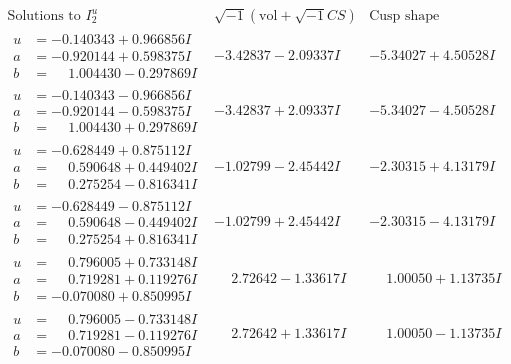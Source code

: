 \documentclass[1p]{elsarticle_modified}
\theoremstyle{definition}
\newcommand{\I}{\sqrt{-1}}
\begin{document}
$$\begin{array}{c|c|c}  
\text{Solutions to }I^u_{2}& \I (\text{vol} + \sqrt{-1}CS) & \text{Cusp shape}\\
 \hline 
\begin{aligned}
u &= -0.140343 + 0.966856 I \\
a &= -0.920144 + 0.598375 I \\
b &= \phantom{-}1.004430 - 0.297869 I\end{aligned}
 & -3.42837 - 2.09337 I & -5.34027 + 4.50528 I \\ \hline\begin{aligned}
u &= -0.140343 - 0.966856 I \\
a &= -0.920144 - 0.598375 I \\
b &= \phantom{-}1.004430 + 0.297869 I\end{aligned}
 & -3.42837 + 2.09337 I & -5.34027 - 4.50528 I \\ \hline\begin{aligned}
u &= -0.628449 + 0.875112 I \\
a &= \phantom{-}0.590648 + 0.449402 I \\
b &= \phantom{-}0.275254 - 0.816341 I\end{aligned}
 & -1.02799 - 2.45442 I & -2.30315 + 4.13179 I \\ \hline\begin{aligned}
u &= -0.628449 - 0.875112 I \\
a &= \phantom{-}0.590648 - 0.449402 I \\
b &= \phantom{-}0.275254 + 0.816341 I\end{aligned}
 & -1.02799 + 2.45442 I & -2.30315 - 4.13179 I \\ \hline\begin{aligned}
u &= \phantom{-}0.796005 + 0.733148 I \\
a &= \phantom{-}0.719281 + 0.119276 I \\
b &= -0.070080 + 0.850995 I\end{aligned}
 & \phantom{-}2.72642 - 1.33617 I & \phantom{-}1.00050 + 1.13735 I \\ \hline\begin{aligned}
u &= \phantom{-}0.796005 - 0.733148 I \\
a &= \phantom{-}0.719281 - 0.119276 I \\
b &= -0.070080 - 0.850995 I\end{aligned}
 & \phantom{-}2.72642 + 1.33617 I & \phantom{-}1.00050 - 1.13735 I \\ \hline\begin{aligned}

\end{aligned}
\end{array}$$
\end{document}
